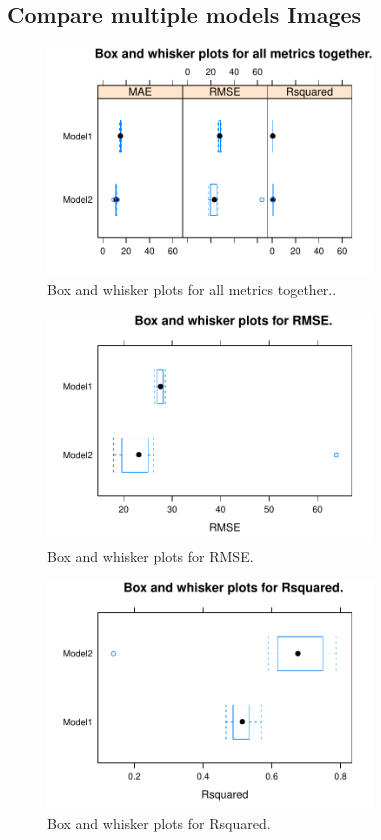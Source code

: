 
\subsection{Compare multiple models Images} 
 

\begin{figure} 
\centering  
\includegraphics[width=0.77\textwidth]{Code_Outputs/ML_compare_models_bwplot_all.pdf} 
\caption{\label{fig:ML_compare_modelsbwplot_all}Box and whisker plots for all metrics together..} 
\end{figure} 
 

\begin{figure} 
\centering  
\includegraphics[width=0.77\textwidth]{Code_Outputs/ML_compare_models_bwplot_RMSE.pdf} 
\caption{\label{fig:ML_compare_modelsbwplot_RMSE}Box and whisker plots for RMSE.} 
\end{figure} 
 

\begin{figure} 
\centering  
\includegraphics[width=0.77\textwidth]{Code_Outputs/ML_compare_models_bwplot_Rsquared.pdf} 
\caption{\label{fig:ML_compare_modelsbwplot_Rsquared}Box and whisker plots for Rsquared.} 
\end{figure} 
 

